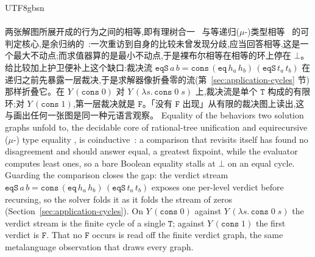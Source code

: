 \begin{CJK*}{UTF8}{gbsn}
  \paragraph{}
  \ifPaperChinese
  两张解图所展开成的行为之间的相等,即有理树合一~\cite{colmerauer1984-trees} 与等递归($\mu$-)类型相等~\cite{amadio1993-subtyping-recursive-types, brandt1998-coinductive-type-equality} 的可判定核心,是余归纳的~\cite{courcelle1983-infinite-trees}:一次重访到自身的比较未曾发现分歧,应当回答相等,这是一个最大不动点;而求值器算的是最小不动点,于是裸布尔相等在相等的环上停在 $\bot$。给比较加上护卫便补上这个缺口:裁决流 $\mathtt{eqS}\,a\,b = \mathtt{cons}\,(\mathtt{eq}\,h_a\,h_b)\,(\mathtt{eqS}\,t_a\,t_b)$ 在递归之前先暴露一层裁决,于是求解器像折叠零的流(第~\ref{sec:application-cycles} 节)那样折叠它。在 $Y\,(\mathtt{cons}\;0)$ 对 $Y\,(\lambda s.\,\mathtt{cons}\;0\;s)$ 上,裁决流是单个 $\mathtt{T}$ 构成的有限环;对 $Y\,(\mathtt{cons}\;1)$,第一层裁决就是 $\mathtt{F}$。「没有 $\mathtt{F}$ 出现」从有限的裁决图上读出,这与画出任何一张图是同一种元语言观察。
  \else
  Equality of the behaviors two solution graphs unfold to, the decidable core of rational-tree unification \cite{colmerauer1984-trees} and equirecursive ($\mu$-) type equality \cite{amadio1993-subtyping-recursive-types, brandt1998-coinductive-type-equality}, is coinductive~\cite{courcelle1983-infinite-trees}: a comparison that revisits itself has found no disagreement and should answer equal, a greatest fixpoint, while the evaluator computes least ones, so a bare Boolean equality stalls at $\bot$ on an equal cycle. Guarding the comparison closes the gap: the verdict stream $\mathtt{eqS}\,a\,b = \mathtt{cons}\,(\mathtt{eq}\,h_a\,h_b)\,(\mathtt{eqS}\,t_a\,t_b)$ exposes one per-level verdict before recursing, so the solver folds it as it folds the stream of zeros (Section~\ref{sec:application-cycles}). On $Y\,(\mathtt{cons}\;0)$ against $Y\,(\lambda s.\,\mathtt{cons}\;0\;s)$ the verdict stream is the finite cycle of a single $\mathtt{T}$; against $Y\,(\mathtt{cons}\;1)$ the first verdict is $\mathtt{F}$. That no $\mathtt{F}$ occurs is read off the finite verdict graph, the same metalanguage observation that draws every graph.
  \fi


\end{CJK*}
